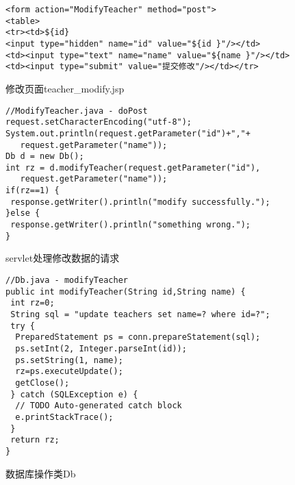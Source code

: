 \begin{figure}
\begin{verbatim}
<form action="ModifyTeacher" method="post">
<table>
<tr><td>${id}
<input type="hidden" name="id" value="${id }"/></td>
<td><input type="text" name="name" value="${name }"/></td>
<td><input type="submit" value="提交修改"/></td></tr>
\end{verbatim}
\caption{修改页面teacher\_modify.jsp}
\label{Log4j-chg}
\end{figure}

\begin{figure}
\begin{verbatim}
//ModifyTeacher.java - doPost
request.setCharacterEncoding("utf-8");
System.out.println(request.getParameter("id")+","+ 
   request.getParameter("name"));
Db d = new Db();
int rz = d.modifyTeacher(request.getParameter("id"), 
   request.getParameter("name"));
if(rz==1) {
 response.getWriter().println("modify successfully.");
}else {
 response.getWriter().println("something wrong.");
}
\end{verbatim}
\caption{servlet处理修改数据的请求}
\label{Log4j-serv-mod}
\end{figure}

\begin{figure}
\begin{verbatim}
//Db.java - modifyTeacher
public int modifyTeacher(String id,String name) {
 int rz=0;
 String sql = "update teachers set name=? where id=?";
 try {
  PreparedStatement ps = conn.prepareStatement(sql);
  ps.setInt(2, Integer.parseInt(id));
  ps.setString(1, name);
  rz=ps.executeUpdate();
  getClose();
 } catch (SQLException e) {
  // TODO Auto-generated catch block
  e.printStackTrace();
 }
 return rz;
}
\end{verbatim}
\caption{数据库操作类Db}
\label{Log4j-db-update}
\end{figure}


